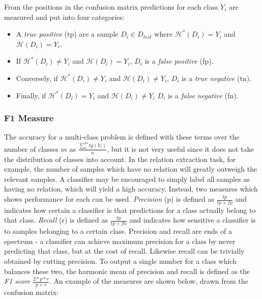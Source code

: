 \begin{center}
\end{center}

From the positions in the confusion matrix predictions for each class $Y_i$ are measured and put into four categories: 

\begin{itemize}
\item A \emph{true positive} (tp) are a sample $D_i \in D_{test}$ where $\mathcal{H}^*(D_i) = Y_i$ and $\mathcal{H}(D_i) = Y_i$. 
\item If $\mathcal{H}^*(D_i) \neq Y_i$ and $\mathcal{H}(D_i) = Y_i$, $D_i$ is a \emph{false positive} (fp). 
\item Conversely, if $\mathcal{H}^*(D_i) \neq Y_i$ and $\mathcal{H}(D_i) \neq Y_i$, $D_i$ is a \emph{true negative} (tn).
\item Finally, if $\mathcal{H}^*(D_i) = Y_i$ and $\mathcal{H}(D_i) \neq Y_i$ $D_i$ is a \emph{false negative} (fn).\\ 
\end{itemize}

\subsubsection{F1 Measure}
The accuracy for a multi-class problem is defined with these terms over the number of classes $m$ as $\frac{\sum_{i}^{m} tp(Y_i)}{n} $, but it is not very useful since it does not take the distribution of classes into account. In the relation extraction task, for example, the number of samples which have no relation will greatly outweigh the relevant samples. A classifier may be encouraged to simply label all samples as having no relation, which will yield a high accuracy. Instead, two measures which shows performance for each can be used. \emph{Precision} (p) is defined as $\frac{tp} {tp+fp}$ and indicates how certain a classifier is that predictions for a class actually belong to that class. \emph{Recall} (r) is defined as $\frac{tp}{tp+fn}$ and indicates how sensitive a classifier is to samples belonging to a certain class. Precision and recall are ends of a spectrum - a classifier can achieve maximum precision for a class by never predicting that class, but at the cost of recall. Likewise recall can be trivially obtained by cutting precision. To output a single number for a class which balances these two, the harmonic mean of precision and recall is defined as the \emph{F1 score} $\frac{2 * p * r}{p + r}$. An example of the measures are shown below, drawn from the confusion matrix:

